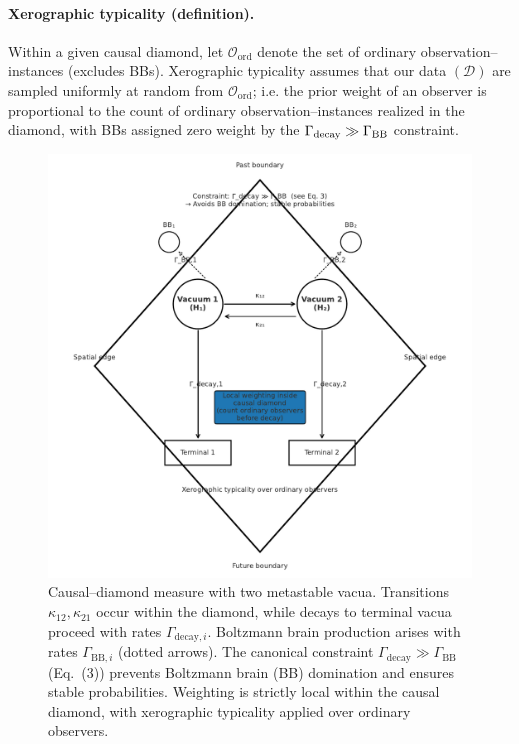 \documentclass[12pt]{article}
\theoremstyle{remark}
\begin{document}
\paragraph{Xerographic typicality (definition).}
Within a given causal diamond, let $\mathcal{O}_{\mathrm{ord}}$ denote the set of ordinary
observation–instances (excludes BBs). Xerographic typicality assumes that our data
$(\mathcal{D})$ are sampled uniformly at random from $\mathcal{O}_{\mathrm{ord}}$; i.e. the prior
weight of an observer is proportional to the count of ordinary observation–instances
realized in the diamond, with BBs assigned zero weight by the $\Gamma_{\rm decay}\gg\Gamma_{\rm BB}$ constraint.


\begin{figure}[t]
  \centering
  \includegraphics[width=0.85\linewidth]{figs/fig_causal_diamond_measure.pdf}
  \caption{Causal–diamond measure with two metastable vacua. 
  Transitions $\kappa_{12}, \kappa_{21}$ occur within the diamond, 
  while decays to terminal vacua proceed with rates $\Gamma_{\mathrm{decay},i}$. 
  Boltzmann brain production arises with rates $\Gamma_{\mathrm{BB},i}$ (dotted arrows). 
  The canonical constraint $\Gamma_{\mathrm{decay}} \gg \Gamma_{\mathrm{BB}}$ (Eq.~(3)) 
  prevents Boltzmann brain (BB) domination and ensures stable probabilities. 
  Weighting is strictly local within the causal diamond, with xerographic typicality 
  applied over ordinary observers.}
  \label{fig:diamond-measure}
\end{figure}
\end{document}
